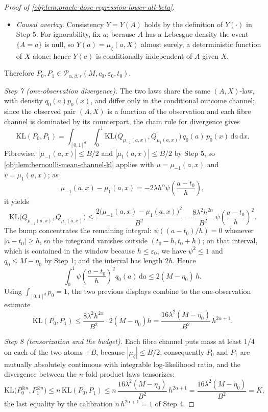 \begin{proof}[Proof of \cref{obj:lem:oracle-dose-regression-lower-all-beta}]
\begin{itemize}
\(p_0\) times Lebesgue measure on \([0,1]^d\); and the \((A,X)\)-law has Lebesgue density
\((a,x)\mapsto q_0(a)p_0(x)=\pi_{P_\zeta}(a\mid x)p_{X,P_\zeta}(x)\) on \([0,1]\times[0,1]^d\), which
is exactly the required factorization.
\item \emph{Causal overlay.} Consistency \(Y=Y(A)\) holds by the definition of \(Y(\cdot)\) in
Step 5. For ignorability, fix \(a\); because \(A\) has a Lebesgue density the event \(\{A=a\}\) is
null, so \(Y(a)=\mu_\zeta(a,X)\) almost surely, a deterministic function of \(X\) alone; hence
\(Y(a)\) is conditionally independent of \(A\) given \(X\).
\end{itemize}
Therefore \(P_0,P_1\in\mathcal P_{\alpha,\beta,s}(M,c_0,\varepsilon_0,t_0)\).

\emph{Step 7 (one-observation divergence).} The two laws share the same \((A,X)\)-law, with density
\(q_0(a)p_0(x)\), and differ only in the conditional outcome channel; since the observed pair
\((A,X)\) is a function of the observation and each fibre channel is dominated by its counterpart,
the chain rule for divergence gives
\[
\mathrm{KL}(P_0,P_1)
=
\int_{[0,1]^d}\!\!\int_0^1
\mathrm{KL}\bigl(Q_{\mu_{-1}(a,x)},Q_{\mu_{1}(a,x)}\bigr)\,
q_0(a)\,p_0(x)\,\mathrm da\,\mathrm dx .
\]
Fibrewise, \(|\mu_{-1}(a,x)|\le B/2\) and \(|\mu_1(a,x)|\le B/2\) by Step 5, so
\cref{obj:lem:bernoulli-mean-channel-kl} applies with \(u=\mu_{-1}(a,x)\) and \(v=\mu_1(a,x)\); as
\[
\mu_{-1}(a,x)-\mu_{1}(a,x)
=
-2\lambda h^{\alpha}\psi\!\left(\frac{a-t_0}{h}\right),
\]
it yields
\[
\mathrm{KL}\bigl(Q_{\mu_{-1}(a,x)},Q_{\mu_{1}(a,x)}\bigr)
\le
\frac{2\bigl(\mu_{-1}(a,x)-\mu_1(a,x)\bigr)^2}{B^2}
=
\frac{8\lambda^2h^{2\alpha}}{B^2}\,
\psi\!\left(\frac{a-t_0}{h}\right)^{2}.
\]
The bump concentrates the remaining integral: \(\psi((a-t_0)/h)=0\) whenever \(|a-t_0|\ge h\), so the
integrand vanishes outside \((t_0-h,t_0+h)\); on that interval, which is contained in the window
because \(h\le\varepsilon_0\), we have \(\psi^2\le 1\) and \(q_0\le M-\eta_0\) by Step 1; and the
interval has length \(2h\). Hence
\[
\int_0^1
\psi\!\left(\frac{a-t_0}{h}\right)^{2}q_0(a)\,\mathrm da
\le
2(M-\eta_0)\,h .
\]
Using \(\int_{[0,1]^d}p_0=1\), the two previous displays combine to the one-observation estimate
\[
\mathrm{KL}(P_0,P_1)
\le
\frac{8\lambda^2h^{2\alpha}}{B^2}\cdot 2(M-\eta_0)h
=
\frac{16\lambda^2(M-\eta_0)}{B^2}\,h^{2\alpha+1}.
\]

\emph{Step 8 (tensorization and the budget).} Each fibre channel puts mass at least \(1/4\) on each
of the two atoms \(\pm B\), because \(|\mu_\zeta|\le B/2\); consequently \(P_0\) and \(P_1\) are
mutually absolutely continuous with integrable log-likelihood ratio, and the divergence between the
\(n\)-fold product laws tensorizes:
\[
\mathrm{KL}\bigl(P_0^{\otimes n},P_1^{\otimes n}\bigr)
\le
n\,\mathrm{KL}(P_0,P_1)
\le
n\,\frac{16\lambda^2(M-\eta_0)}{B^2}\,h^{2\alpha+1}
=
\frac{16\lambda^2(M-\eta_0)}{B^2}
=
K,
\]
the last equality by the calibration \(n\,h^{2\alpha+1}=1\) of Step 4.


\end{proof}
